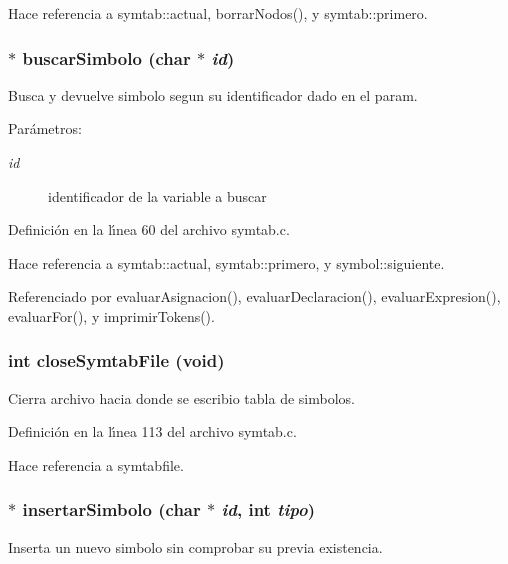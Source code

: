 Hace referencia a symtab::actual, borrar\-Nodos(), y symtab::primero.
\subsubsection{$\ast$ buscar\-Simbolo (char $\ast$ {\em id})}\label{symtab_8h_a3}


Busca y devuelve simbolo segun su identificador dado en el param. 

\begin{Desc}
\item[Par\'{a}metros:]
\begin{description}
\item[{\em id}]identificador de la variable a buscar \end{description}
\end{Desc}


Definici\'{o}n en la l\'{\i}nea 60 del archivo symtab.c.

Hace referencia a symtab::actual, symtab::primero, y symbol::siguiente.

Referenciado por evaluar\-Asignacion(), evaluar\-Declaracion(), evaluar\-Expresion(), evaluar\-For(), y imprimir\-Tokens().
\subsubsection{\setlength{\rightskip}{0pt plus 5cm}int close\-Symtab\-File (void)}\label{symtab_8h_a6}


Cierra archivo hacia donde se escribio tabla de simbolos. 



Definici\'{o}n en la l\'{\i}nea 113 del archivo symtab.c.

Hace referencia a symtabfile.
\subsubsection{$\ast$ insertar\-Simbolo (char $\ast$ {\em id}, int {\em tipo})}\label{symtab_8h_a2}


Inserta un nuevo simbolo sin comprobar su previa existencia. 


